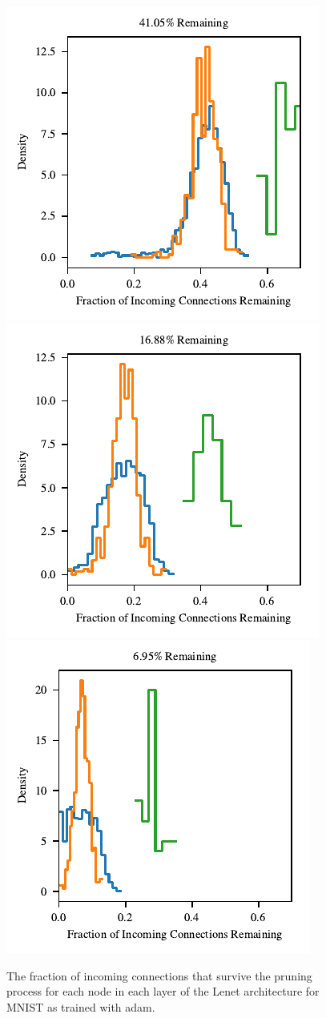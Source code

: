 \begin{figure}
\centering
\includegraphics[width=.25\textwidth]{graphs/mnist/lenet/vanilla/histogram_connectivity_incoming4}%
\includegraphics[width=.25\textwidth]{graphs/mnist/lenet/vanilla/histogram_connectivity_incoming8}%
\includegraphics[width=.25\textwidth]{graphs/mnist/lenet/vanilla/histogram_connectivity_incoming12}
\caption{The fraction of incoming connections that survive the pruning process for each node in each layer of the Lenet architecture for MNIST as trained with adam.}
\label{fig:adam-ticket-connectivity}
\end{figure}

